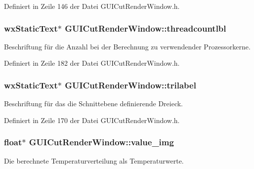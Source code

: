 Definiert in Zeile 146 der Datei G\-U\-I\-Cut\-Render\-Window.\-h.

\hypertarget{classGUICutRenderWindow_a2797a52c219092ce3f54ea62ec4b95f3}{
\subsubsection[{threadcountlbl}]{\setlength{\rightskip}{0pt plus 5cm}wx\-Static\-Text$\ast$ G\-U\-I\-Cut\-Render\-Window\-::threadcountlbl\hspace{0.3cm}{\ttfamily [private]}}}\label{classGUICutRenderWindow_a2797a52c219092ce3f54ea62ec4b95f3}
Beschriftung für die Anzahl bei der Berechnung zu verwendender Prozessorkerne. 

Definiert in Zeile 182 der Datei G\-U\-I\-Cut\-Render\-Window.\-h.

\hypertarget{classGUICutRenderWindow_a1d6dae72dbc65725dee34799e7fb7af1}{
\subsubsection[{trilabel}]{\setlength{\rightskip}{0pt plus 5cm}wx\-Static\-Text$\ast$ G\-U\-I\-Cut\-Render\-Window\-::trilabel\hspace{0.3cm}{\ttfamily [private]}}}\label{classGUICutRenderWindow_a1d6dae72dbc65725dee34799e7fb7af1}
Beschriftung für das die Schnittebene definierende Dreieck. 

Definiert in Zeile 170 der Datei G\-U\-I\-Cut\-Render\-Window.\-h.

\hypertarget{classGUICutRenderWindow_a9c8338a733363aea25a8735d6873a414}{
\subsubsection[{value\-\_\-img}]{\setlength{\rightskip}{0pt plus 5cm}float$\ast$ G\-U\-I\-Cut\-Render\-Window\-::value\-\_\-img\hspace{0.3cm}{\ttfamily [private]}}}\label{classGUICutRenderWindow_a9c8338a733363aea25a8735d6873a414}
Die berechnete Temperaturverteilung als Temperaturwerte. 

